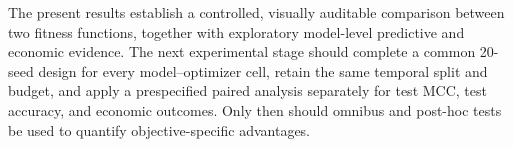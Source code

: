 \documentclass[sn-mathphys-num,Numbered]{sn-jnl}
\begin{document}
The present results establish a controlled, visually auditable comparison between two fitness functions, together with exploratory model-level predictive and economic evidence. The next experimental stage should complete a common 20-seed design for every model--optimizer cell, retain the same temporal split and budget, and apply a prespecified paired analysis separately for test MCC, test accuracy, and economic outcomes. Only then should omnibus and post-hoc tests be used to quantify objective-specific advantages.


\end{document}
